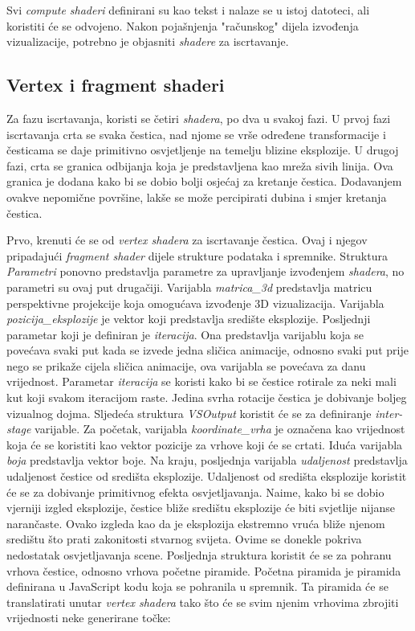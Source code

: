 \documentclass{foi}
\begin{document}
Svi \textit{compute shaderi} definirani su kao tekst i nalaze se u istoj datoteci, ali koristiti će se odvojeno. Nakon pojašnjenja "računskog" dijela izvođenja vizualizacije, potrebno je objasniti \textit{shadere} za iscrtavanje. 
	
\subsection{Vertex i fragment shaderi}
Za fazu iscrtavanja, koristi se četiri \textit{shadera}, po dva u svakoj fazi. U prvoj fazi iscrtavanja crta se svaka čestica, nad njome se vrše određene transformacije i česticama se daje primitivno osvjetljenje na temelju blizine eksplozije. U drugoj fazi, crta se granica odbijanja koja je predstavljena kao mreža sivih linija. Ova granica je dodana kako bi se dobio bolji osjećaj za kretanje čestica. Dodavanjem ovakve nepomične površine, lakše se može percipirati dubina i smjer kretanja čestica.  

Prvo, krenuti će se od \textit{vertex shadera} za iscrtavanje čestica. Ovaj i njegov pripadajući \textit{fragment shader} dijele strukture podataka i spremnike. Struktura \textit{Parametri} ponovno predstavlja parametre za upravljanje izvođenjem \textit{shadera}, no parametri su ovaj put drugačiji. Varijabla \textit{matrica\_3d} predstavlja matricu perspektivne projekcije koja omogućava izvođenje 3D vizualizacija. Varijabla \textit{pozicija\_eksplozije} je vektor koji predstavlja središte eksplozije. Posljednji parametar koji je definiran je \textit{iteracija}. Ona predstavlja varijablu koja se povećava svaki put kada se izvede jedna sličica animacije, odnosno svaki put prije nego se prikaže cijela sličica animacije, ova varijabla se povećava za danu vrijednost. Parametar \textit{iteracija} se koristi kako bi se čestice rotirale za neki mali kut koji svakom iteracijom raste. Jedina svrha rotacije čestica je dobivanje boljeg vizualnog dojma. Sljedeća struktura \textit{VSOutput} koristit će se za definiranje \textit{inter-stage} varijable. Za početak, varijabla \textit{koordinate\_vrha} je označena kao vrijednost koja će se koristiti kao vektor pozicije za vrhove koji će se crtati. Iduća varijabla \textit{boja} predstavlja vektor boje. Na kraju, posljednja varijabla \textit{udaljenost} predstavlja udaljenost čestice od središta eksplozije. Udaljenost od središta eksplozije koristit će se za dobivanje primitivnog efekta osvjetljavanja. Naime, kako bi se dobio vjerniji izgled eksplozije, čestice bliže središtu eksplozije će biti svjetlije nijanse narančaste. Ovako izgleda kao da je eksplozija ekstremno vruća bliže njenom središtu što prati zakonitosti stvarnog svijeta. Ovime se donekle pokriva nedostatak osvjetljavanja scene. Posljednja struktura koristit će se za pohranu vrhova čestice, odnosno vrhova početne piramide. Početna piramida je piramida definirana u JavaScript kodu koja se pohranila u spremnik. Ta piramida će se translatirati unutar \textit{vertex shadera} tako što će se svim njenim vrhovima zbrojiti vrijednosti neke generirane točke:
\end{document}

